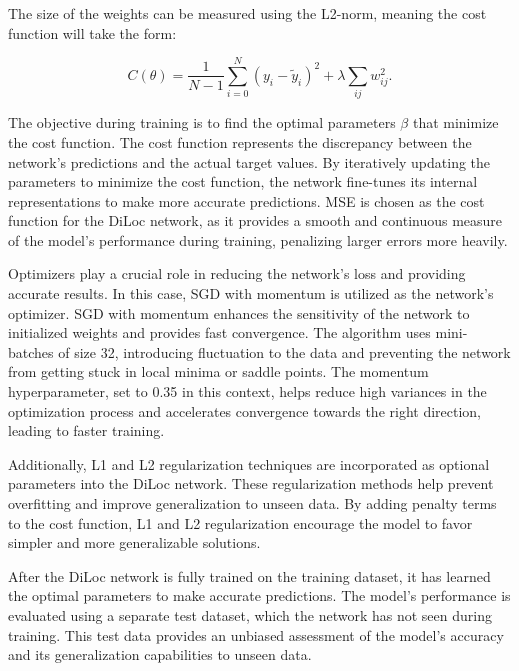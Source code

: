 \documentclass[a4paper, UKenglish, 11pt]{uiomaster}
\begin{document}
The size of the weights can be measured using the L2-norm, meaning the cost function will take the form:

\begin{equation}
{C}(\theta) = \frac{1}{N-1}
\sum_{i=0}^{N}(y_i-\tilde{y}_i)^2 + \lambda\sum_{ij}w^2_{ij}.
\label{eq:L2}
\end{equation}



The objective during training is to find the optimal parameters $\beta$ that minimize the cost function. The cost function represents the discrepancy between the network's predictions and the actual target values. By iteratively updating the parameters to minimize the cost function, the network fine-tunes its internal representations to make more accurate predictions. MSE is chosen as the cost function for the DiLoc network, as it provides a smooth and continuous measure of the model's performance during training, penalizing larger errors more heavily.

Optimizers play a crucial role in reducing the network's loss and providing accurate results. In this case, SGD with momentum is utilized as the network's optimizer. SGD with momentum enhances the sensitivity of the network to initialized weights and provides fast convergence. The algorithm uses mini-batches of size 32, introducing fluctuation to the data and preventing the network from getting stuck in local minima or saddle points. The momentum hyperparameter, set to 0.35 in this context, helps reduce high variances in the optimization process and accelerates convergence towards the right direction, leading to faster training.



Additionally, L1 and L2 regularization techniques are incorporated as optional parameters into the DiLoc network. These regularization methods help prevent overfitting and improve generalization to unseen data. By adding penalty terms to the cost function, L1 and L2 regularization encourage the model to favor simpler and more generalizable solutions.

After the DiLoc network is fully trained on the training dataset, it has learned the optimal parameters to make accurate predictions. The model's performance is evaluated using a separate test dataset, which the network has not seen during training. This test data provides an unbiased assessment of the model's accuracy and its generalization capabilities to unseen data.
\end{document}
